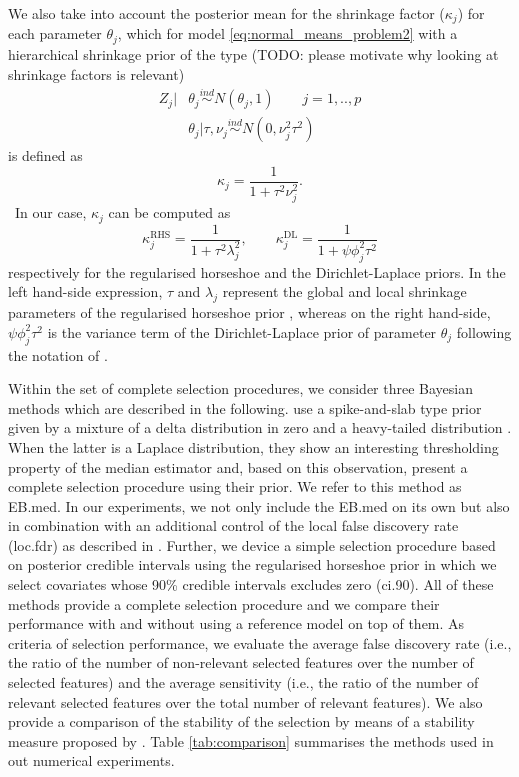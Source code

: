 \documentclass[american,]{article}
\theoremstyle{definition}
\begin{document}
We also take into account the posterior mean for the shrinkage factor ($\kappa_{j}$) for each parameter $\theta_{j}$, which for model \eqref{eq:normal_means_problem2} with a hierarchical shrinkage prior of the type (TODO: please motivate why looking at shrinkage factors is relevant)
\begin{align}
Z_{j}|&\theta_{j}\overset{ind}{\sim}N(\theta_{j},1) \qquad j=1,..,p \\
&\theta_{j}|\tau,\nu_{j}\overset{ind}{\sim}N(0,\nu_{j}^{2}\tau^{2})
\end{align}
is defined as
\begin{equation}
\kappa_{j}=\frac{1}{1+\tau^{2}\nu_{j}^{2}}.
\end{equation}
\
In our case, $\kappa_{j}$ can be computed as
\begin{equation}
\kappa_{j}^{\text{RHS}}=\frac{1}{1+\tau^{2}\lambda_{j}^{2}}, \qquad \kappa_{j}^{\text{DL}}=\frac{1}{1+\psi\phi_{j}^{2}\tau^{2}}
\end{equation}
respectively for the regularised horseshoe and the Dirichlet-Laplace priors. In the left hand-side expression, $\tau$ and $\lambda_{j}$ represent the global and local shrinkage parameters of the regularised horseshoe prior \cite[for further details see][]{paper:rhs}, whereas on the right hand-side, $\psi\phi_{j}^{2}\tau^{2}$ is the variance term of the Dirichlet-Laplace prior of parameter $\theta_{j}$ following the notation of \cite{paper:dirichlet_laplace}.

Within the set of complete selection procedures, we consider three 
Bayesian methods which are described in the following.
\cite{johnstone2004needles} use a spike-and-slab type prior given by a mixture of a delta distribution in zero and a heavy-tailed distribution \cite[see also][]{paper:spike_slab_mitchell}. When the latter is a Laplace distribution, they show an interesting thresholding property of the median estimator and, based on this observation, present a complete selection procedure using their prior. We refer to this method as EB.med. In our experiments, we not only include the EB.med on its own but also in combination with an additional control of the local false discovery rate (loc.fdr) as described in \cite{paper:efron, efron2012large}. Further, we device a simple selection procedure based on posterior credible intervals using the regularised horseshoe prior in which we select covariates whose 90\% credible intervals excludes zero (ci.90). All of these methods provide a complete selection procedure and we compare their performance with and without using a reference model on top of them. As criteria of selection performance, we evaluate the average false discovery rate (i.e., the ratio of the number of non-relevant selected features over the number of selected features) and the average sensitivity (i.e., the ratio of the number of relevant selected features over the total number of relevant features). We also provide a comparison of the stability of the selection by means of a stability measure proposed by \cite{paper:stability}. Table \ref{tab:comparison} summarises the methods used in out numerical experiments.
\end{document}
